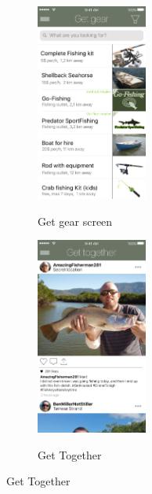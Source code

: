 \begin{figure}[t!]
\begin{subfigure}[t]{0.2\textwidth}
  	  \includegraphics[width=0.4\textwidth]{images/Get_gear.png}
  	  \label{fig:f3}
   	  \caption{Get gear screen}
  \end{subfigure}  
  \hfill
  \begin{subfigure}[t]{0.2\textwidth}
  	  \includegraphics[width=0.4\textwidth]{images/Together.png}
  	  \label{fig:f4}
   	  \caption{Get Together}
  \end{subfigure}
  \hfill
 \end{figure}

